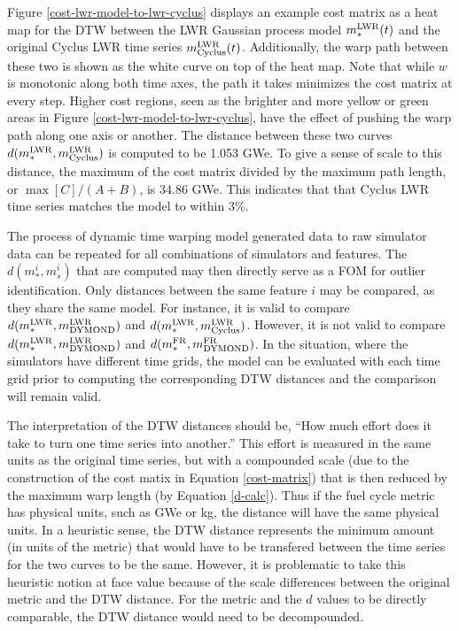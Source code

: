 Figure \ref{cost-lwr-model-to-lwr-cyclus} displays an example cost matrix 
as a heat map for the DTW between the LWR Gaussian process model 
$m_*^{\mathrm{LWR}}(t)$ and the original Cyclus LWR time series $m_{\mathrm{Cyclus}}^{\mathrm{LWR}}(t)$.
Additionally, the warp path between these two is shown as the white curve
on top of the heat map. Note that while $w$ is monotonic along both time axes, the
path it takes minimizes the cost matrix at every step. Higher cost regions,
seen as the brighter and more yellow or green areas in Figure \ref{cost-lwr-model-to-lwr-cyclus},
have the effect of pushing the warp path along one axis or another. The 
distance between these two curves $d(m_*^{\mathrm{LWR}}, m_{\mathrm{Cyclus}}^{\mathrm{LWR}})$ is computed 
to be 1.053 GWe. To give a sense of scale to this distance, the maximum of 
the cost matrix divided by the 
maximum path length, or $\max[C]/(A+B)$, is 34.86 GWe.  This 
indicates that that Cyclus LWR time series matches the model to within 3\%.

The process of dynamic time warping model generated data to raw simulator data can be 
repeated for all combinations of simulators and features. The 
$d(m_*^i, m_s^i)$ that are computed may then directly serve as a FOM for
outlier identification. Only distances between the same feature $i$ may be compared,
as they share the same model. For instance, it is valid to compare
$d(m_*^{\mathrm{LWR}}, m_{\mathrm{DYMOND}}^{\mathrm{LWR}})$ and $d(m_*^{\mathrm{LWR}}, m_{\mathrm{Cyclus}}^{\mathrm{LWR}})$. However,  
it is not valid to compare $d(m_*^{\mathrm{LWR}}, m_{\mathrm{DYMOND}}^{\mathrm{LWR}})$ and 
$d(m_*^{\mathrm{FR}}, m_{\mathrm{DYMOND}}^{\mathrm{FR}})$.  In the situation, where the simulators 
have different time grids, the model can be evaluated with each time grid
prior to computing the corresponding DTW distances and the comparison will
remain valid.

The interpretation of the DTW distances should be, ``How much effort does
it take to turn one time series into another.'' This effort is measured 
in the same units as the original time series, but with a compounded
scale (due to the construction of the cost matix in Equation \ref{cost-matrix}) 
that is then reduced by 
the maximum warp length (by Equation \ref{d-calc}). Thus if the fuel 
cycle metric has physical units, such as GWe or kg, the distance will have 
the same physical units. In a heuristic sense, the DTW distance represents
the minimum amount (in units of the metric) that would have to be transfered
between the time series for the two curves to be the same. However, it is
problematic to take this heuristic notion at face value because of the 
scale differences between the original metric and the DTW distance.
For the metric and the $d$ values to be directly comparable, the DTW distance
would need to be decompounded.

